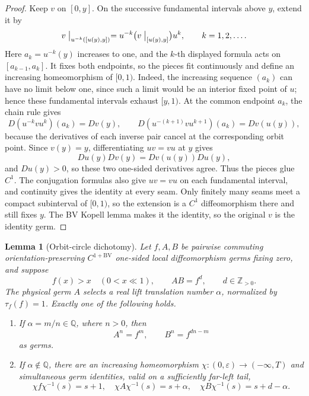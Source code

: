 \documentclass[11pt]{article}
\newtheorem{lemma}[theorem]{Lemma}
\theoremstyle{definition}
\theoremstyle{remark}
\begin{document}
\begin{proof}
Keep \(v\) on \([0,y]\).  On the successive fundamental intervals above
\(y\), extend it by
\[
 v\bigm|_{u^{-k}([u(y),y])}
   =u^{-k}\bigl(v\bigm|_{[u(y),y]}\bigr)u^k,
 \qquad k=1,2,\ldots .
\]
Here \(a_k=u^{-k}(y)\) increases to one, and the \(k\)-th displayed formula
acts on \([a_{k-1},a_k]\).  It fixes both endpoints, so the pieces fit
continuously and define an increasing homeomorphism of \([0,1)\).  Indeed,
the increasing sequence \((a_k)\) can have no limit below one, since such a
limit would be an interior fixed point of \(u\); hence these fundamental
intervals exhaust \([y,1)\).
At the common endpoint \(a_k\), the chain rule gives
\[
 D(u^{-k}vu^k)(a_k)=Dv(y),\qquad
 D(u^{-(k+1)}vu^{k+1})(a_k)=Dv(u(y)),
\]
because the derivatives of each inverse pair cancel at the corresponding
orbit point.  Since
\(v(y)=y\), differentiating \(uv=vu\) at \(y\) gives
\[
 Du(y)Dv(y)=Dv(u(y))Du(y),
\]
and \(Du(y)>0\), so these two one-sided derivatives agree.  Thus the pieces
glue \(C^1\).  The conjugation formulas also give \(uv=vu\) on each
fundamental interval, and continuity gives the identity at every seam.
Only finitely many seams meet a compact subinterval of \([0,1)\), so the
extension is a \(C^1\) diffeomorphism there and still fixes \(y\).
The BV Kopell lemma makes it the identity, so the original \(v\) is the
identity germ.
\end{proof}

\begin{lemma}[Orbit-circle dichotomy]\label{lem:orbit-circle}
Let \(f,A,B\) be pairwise commuting orientation-preserving
\(C^{1+\mathrm{BV}}\) one-sided local diffeomorphism germs fixing zero, and
suppose
\[
 f(x)>x\quad(0<x\ll1),\qquad AB=f^d,\qquad d\in\mathbb Z_{>0}.
\]
The physical germ \(A\) selects a real lift translation number \(\alpha\),
normalized by \(\tau_f(f)=1\).  Exactly one of the following holds.
\begin{enumerate}
\item If \(\alpha=m/n\in\mathbb Q\), where \(n>0\), then
\begin{equation}\label{eq:rational-germ-powers}
 A^n=f^m,\qquad B^n=f^{dn-m}
\end{equation}
as germs.
\item If \(\alpha\notin\mathbb Q\), there are an increasing homeomorphism
\(\chi:(0,\varepsilon)\to(-\infty,T)\) and simultaneous germ identities,
valid on a sufficiently far-left tail,
\begin{equation}\label{eq:irrational-germ-translations}
 \chi f\chi^{-1}(s)=s+1,\quad
 \chi A\chi^{-1}(s)=s+\alpha,\quad
 \chi B\chi^{-1}(s)=s+d-\alpha.
\end{equation}
\end{enumerate}
\end{lemma}
\end{document}
